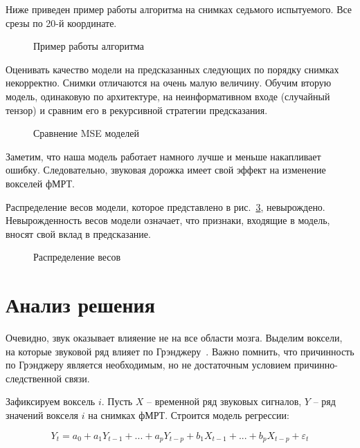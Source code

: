 \documentclass[12pt, twoside]{article}
\begin{document}
Ниже приведен пример работы алгоритма на снимках седьмого испытуемого. Все срезы по 20-й координате.

\begin{figure}[h!]
	\caption{Пример работы алгоритма}
	\label{fig:example}
\end{figure}

Оценивать качество модели на предсказанных следующих по порядку снимках некорректно. Снимки отличаются на очень малую величину. Обучим вторую модель, одинаковую по архитектуре, на неинформативном входе (случайный тензор) и сравним его в рекурсивной стратегии предсказания.

\begin{figure}[h!]
	\caption{Сравнение MSE моделей}
	\label{fig:example}
\end{figure}

Заметим, что наша модель работает намного лучше и меньше накапливает ошибку. Следовательно, звуковая дорожка имеет свой эффект на изменение вокселей фМРТ.

Распределение весов модели, которое представлено в рис.~\ref{fig:weights}, невырождено. Невырожденность весов модели означает, что признаки, входящие в модель, вносят свой вклад в предсказание.

\begin{figure}[h!]
	\caption{Распределение весов}
	\label{fig:weights}
\end{figure}

\section{Анализ решения}

Очевидно, звук оказывает влияение не на все области мозга. Выделим воксели, на которые звуковой ряд влияет по Грэнджеру~\citep{granger}. Важно помнить, что причинность по Грэнджеру является необходимым, но не достаточным условием причинно-следственной связи.

Зафиксируем воксель $i$. Пусть $X$ -- временной ряд звуковых сигналов, $Y$ -- ряд значений вокселя $i$ на снимках фМРТ. Строится модель регрессии:

\begin{equation}
	\label{eq10}
	Y_{t}=a_{0}+a_{1}Y_{t-1}+...+a_{p}Y_{t-p}+b_{1}X_{t-1}+...+b_{p}X_{t-p}+\varepsilon _{t}
\end{equation}
\end{document}
